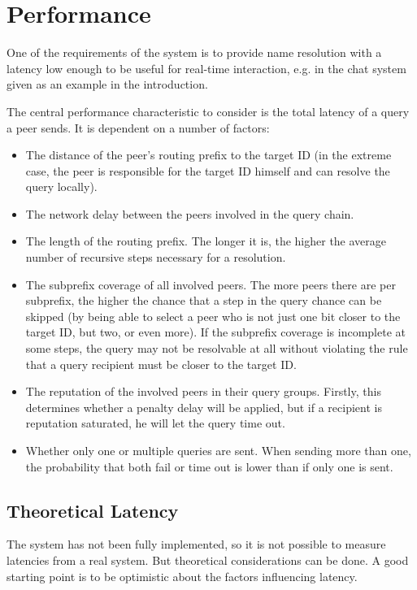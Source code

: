 \chapter{Performance}
\label{chap:performance}
One of the requirements of the system is to provide name resolution with a
latency low enough to be useful for real-time interaction, e.g. in the chat
system given as an example in the introduction.

The central performance characteristic to consider is the total latency of a
query a peer sends. It is dependent on a number of factors:

\begin{itemize}
\item The distance of the peer's routing prefix to the target ID (in the extreme
case, the peer is responsible for the target ID himself and can resolve the
query locally).
\item The network delay between the peers involved in the query chain.
\item The length of the routing prefix. The longer it is, the higher the average
number of recursive steps necessary for a resolution.
\item The subprefix coverage of all involved peers. The more peers there are per
subprefix, the higher the chance that a step in the query chance can be skipped
(by being able to select a peer who is not just one bit closer to the target ID,
but two, or even more). If the subprefix coverage is incomplete at some steps,
the query may not be resolvable at all without violating the rule that a query
recipient must be closer to the target ID.
\item The reputation of the involved peers in their query groups. Firstly, this
determines whether a penalty delay will be applied, but if a recipient is
reputation saturated, he will let the query time out.
\item Whether only one or multiple queries are sent. When sending more than one,
the probability that both fail or time out is lower than if only one is sent.
\end{itemize}

\section{Theoretical Latency}
The system has not been fully implemented, so it is not possible to measure
latencies from a real system. But theoretical considerations can be done. A good
starting point is to be optimistic about the factors influencing latency.

